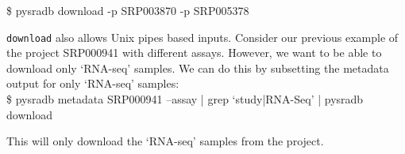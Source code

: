 \documentclass[9pt,a4paper]{extarticle}
\newenvironment{allintypewriter}{\ttfamily}{\par}
\begin{document}
\begin{allintypewriter}
\$  pysradb download -p SRP003870 -p SRP005378
\end{allintypewriter}

\texttt{download} also allows Unix pipes based inputs. Consider our previous
example of the project SRP000941 with different assays. However, we want to be able
to download only `RNA-seq' samples. We can do this by subsetting the metadata
output for only `RNA-seq' samples:\\


\begin{allintypewriter}
\$ pysradb metadata SRP000941 --assay | grep `study|RNA-Seq' | pysradb download
\end{allintypewriter}



This will only download the `RNA-seq' samples from the project.




\begin{comment}
Once you have fetched the metadata and made sure, this is the project you were 
looking for, you would want to download everything at once. NCBI follows this 
hiererachy: `SRP => SRX => SRR'. Each `SRP' (project) has multiple `SRX` 
(experiments) and each `SRX' in turn has multiple `SRR` (runs) inside it.
We want to mimick this hiereachy in our downloads. The reason to do that is simple:
in most cases you care about `SRX' the most, and would want to "merge" your SRRs
in one way or the other. Having this hierearchy ensures your downstream code
can handle such cases easily, without worrying about which runs (SRR) need to
be merged.


\begin{allintypewriter}
\$ pysradb download -p SRP063852 
\end{allintypewriter}

Often, you need to process only a smaller set of samples from a project (SRP).
Consider the project SRP000941 which has data spanning four assays. But, we might be 
only interested in analyzing the `RNA-seq' samples and would just want to download
that subset. This can be done simply using the following command:



\begin{allintypewriter}
\$ pysradb metadata SRP000941 --assay $|$ grep `study$|$RNA-Seq' $|$ pysradb download
\end{allintypewriter}

\end{comment}
\end{document}
